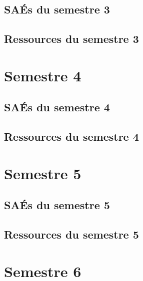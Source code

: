\documentclass[10pt,french]{article} %
\begin{document}
\subsection{SAÉs du semestre 3}

%
\subsection{Ressources du semestre 3}


\newpage


\section{Semestre 4}
\def\sem{D} %

\subsection{SAÉs du semestre 4}


\subsection{Ressources du semestre 4}


\newpage


\section{Semestre 5}
\def\sem{E} %

\subsection{SAÉs du semestre 5}


\subsection{Ressources du semestre 5}


\newpage


\section{Semestre 6}
\def\sem{F} %
\end{document}
